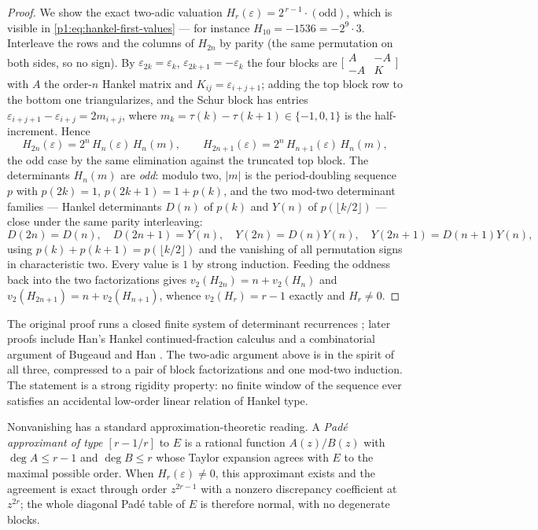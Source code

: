 \documentclass[11pt,oneside]{article}
\numberwithin{equation}{section}
\theoremstyle{definition}
\theoremstyle{remark}
\newcommand{\eps}{\varepsilon}
\begin{document}
\begin{proof}
We show the exact two-adic valuation
\(H_r(\eps)=2^{\,r-1}\cdot(\text{odd})\), which is visible in
\eqref{p1:eq:hankel-first-values} --- for instance
\(H_{10}=-1536=-2^9\cdot3\).  Interleave the rows and the columns of
\(H_{2n}\) by parity (the same permutation on both sides, so no sign).
By \(\eps_{2k}=\eps_k\), \(\eps_{2k+1}=-\eps_k\) the four blocks
are \(\bigl[\begin{smallmatrix}A&-A\\-A&K\end{smallmatrix}\bigr]\)
with \(A\) the order-\(n\) Hankel matrix and
\(K_{ij}=\eps_{i+j+1}\); adding the top block row to the bottom one
triangularizes, and the Schur block has entries
\(\eps_{i+j+1}-\eps_{i+j}=2m_{i+j}\), where
\(m_k=\tau(k)-\tau(k+1)\in\{-1,0,1\}\) is the half-increment.
Hence
\[
  H_{2n}(\eps)=2^n\,H_n(\eps)\,H_n(m),
  \qquad
  H_{2n+1}(\eps)=2^n\,H_{n+1}(\eps)\,H_n(m),
\]
the odd case by the same elimination against the truncated top block.
The determinants \(H_n(m)\) are \emph{odd}: modulo two, \(|m|\) is
the period-doubling sequence \(p\) with \(p(2k)=1\),
\(p(2k+1)=1+p(k)\), and the two mod-two determinant families ---
Hankel determinants \(D(n)\) of \(p(k)\) and \(Y(n)\) of
\(p(\lfloor k/2\rfloor)\) --- close under the same parity
interleaving:
\[
  D(2n)=D(n),\quad D(2n+1)=Y(n),\quad
  Y(2n)=D(n)Y(n),\quad Y(2n+1)=D(n+1)Y(n),
\]
using \(p(k)+p(k+1)=p(\lfloor k/2\rfloor)\) and the vanishing of
all permutation signs in characteristic two.  Every value is \(1\) by
strong induction.  Feeding the oddness back into the two
factorizations gives \(v_2(H_{2n})=n+v_2(H_n)\) and
\(v_2(H_{2n+1})=n+v_2(H_{n+1})\), whence \(v_2(H_r)=r-1\) exactly
and \(H_r\ne0\).
\end{proof}

The original proof runs a closed finite system of determinant recurrences
\cite{p1:apww1998}; later proofs include Han's Hankel continued-fraction
calculus \cite{p1:han2014} and a combinatorial argument of Bugeaud and Han
\cite{p1:bugeaudHan2014}.  The two-adic argument above is in the spirit of
all three, compressed to a pair of block factorizations and one mod-two
induction.  The statement is a strong rigidity property: no
finite window of the sequence ever satisfies an accidental low-order linear
relation of Hankel type.

Nonvanishing has a standard approximation-theoretic reading.  A \emph{Pad\'e
approximant of type \([r-1/r]\)} to \(E\) is a rational function
\(A(z)/B(z)\) with \(\deg A\le r-1\) and \(\deg B\le r\) whose Taylor
expansion agrees with \(E\) to the maximal possible order.  When
\(H_r(\eps)\ne0\), this approximant exists and the agreement is exact
through order \(z^{2r-1}\) with a nonzero discrepancy coefficient at
\(z^{2r}\); the whole diagonal Pad\'e table of \(E\) is therefore normal,
with no degenerate blocks.
\end{document}
